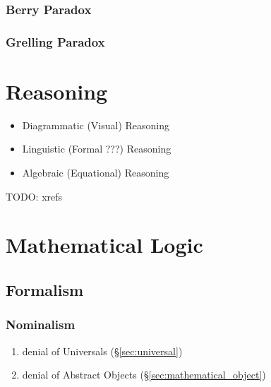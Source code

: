 \subsubsection{Berry Paradox}\label{sec:berry_paradox}

\subsubsection{Grelling Paradox}\label{sec:grelling_paradox}



\section{Reasoning}\label{sec:reasoning}

\begin{itemize}
  \item Diagrammatic (Visual) Reasoning
  \item Linguistic (Formal ???) Reasoning
  \item Algebraic (Equational) Reasoning
\end{itemize}

TODO: xrefs



\section{Mathematical Logic}\label{sec:mathematical_logic}
\cite{curry77}

\subsection{Formalism}\label{sec:formalism}

\subsubsection{Nominalism}\label{sec:nominalism}

\begin{enumerate}
  \item denial of Universals (\S\ref{sec:universal})
  \item denial of Abstract Objects (\S\ref{sec:mathematical_object})
\end{enumerate}



